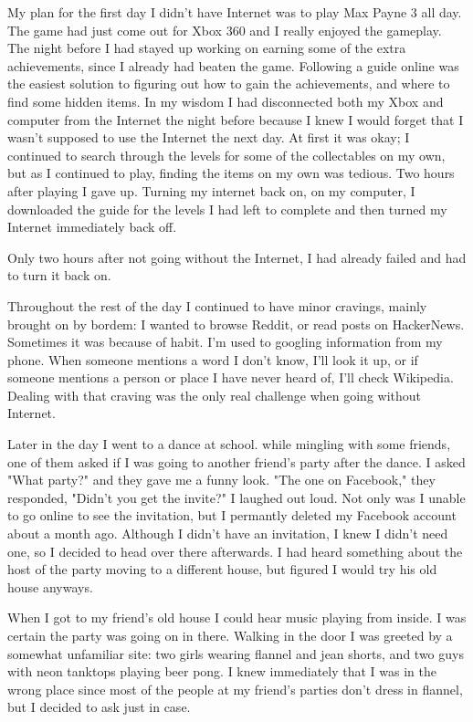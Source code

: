 \documentclass[12pt,letterpaper]{article}
\begin{document}
My plan for the first day I didn't have Internet was to play Max Payne 3
all day. The game had just come out for Xbox 360 and I really enjoyed
the gameplay. The night before I had stayed up working on earning some
of the extra achievements, since I already had beaten the game.
Following a guide online was the easiest solution to figuring out how to
gain the achievements, and where to find some hidden items. In my wisdom
I had disconnected both my Xbox and computer from the Internet the night
before because I knew I would forget that I wasn't supposed to use the
Internet the next day. At first it was okay; I continued to search
through the levels for some of the collectables on my own, but as I 
continued to play, finding the items on my own was tedious. Two hours
after playing I gave up. Turning my internet back on, on my computer, I
downloaded the guide for the levels I had left to complete and then
turned my Internet immediately back off. 

Only two hours after not going without the Internet, I had already
failed and had to turn it back on.

Throughout the rest of the day I continued to have minor cravings,
mainly brought on by bordem: I wanted to browse Reddit, or read posts on
HackerNews. Sometimes it was because of habit. I'm used to googling
information from my phone. When someone mentions a word I don't know,
I'll look it up, or if someone mentions a person or place I have never
heard of, I'll check Wikipedia. Dealing with that craving was the only
real challenge when going without Internet.

Later in the day I went to a dance at school.
while mingling with some friends, one of them asked if I was going to
another friend's party after the dance. I asked "What party?" and they
gave me a funny look. "The one on Facebook," they responded, "Didn't you
get the invite?" I laughed out loud. Not only was I unable to go online
to see the invitation, but I permantly deleted my Facebook account about
a month ago. Although I didn't have an invitation, I knew I didn't need
one, so I decided to head over there afterwards. I had heard something
about the host of the party moving to a different house, but figured I
would try his old house anyways.

When I got to my friend's old house I could hear music playing from
inside. I was certain the party was going on in there. Walking in the
door I was greeted by a somewhat unfamiliar site: two girls wearing
flannel and jean shorts, and two guys with neon tanktops playing beer
pong. I knew immediately that I was in the wrong place since most of the
people at my friend's parties don't dress in flannel, but I
decided to ask just in case.
\end{document}

